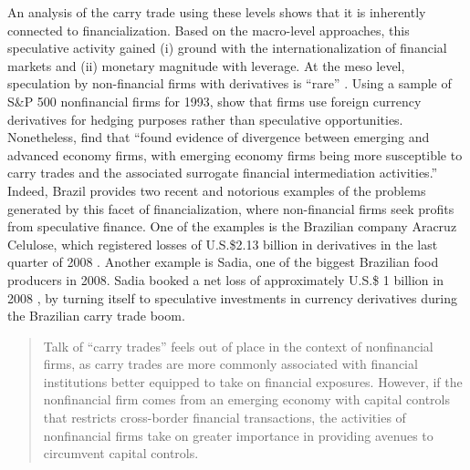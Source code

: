 \documentclass[a4paper, twoside]{templates/ociamthesis}
\begin{document}
An analysis of the carry trade using these levels shows that it is inherently connected to financialization. Based on the macro-level approaches, this speculative activity gained (i) ground with the internationalization of financial markets and (ii) monetary magnitude with leverage. At the meso level, speculation by non-financial firms with derivatives is ``rare'' \autocite{bartram2019}. Using a sample of S\&P 500 nonfinancial firms for 1993, \textcite{allayannis2001} show that firms use foreign currency derivatives for hedging purposes rather than speculative opportunities. Nonetheless, \textcite[ 741]{bruno2017} find that ``found evidence of divergence between emerging and advanced economy firms, with emerging economy firms being more susceptible to carry trades and the associated surrogate financial intermediation activities.'' Indeed, Brazil provides two recent and notorious examples of the problems generated by this facet of financialization, where non-financial firms seek profits from speculative finance. One of the examples is the Brazilian company Aracruz Celulose, which registered losses of U.S.\$2.13 billion in derivatives in the last quarter of 2008 \autocite{zeidan2013}. Another example is Sadia, one of the biggest Brazilian food producers in 2008. Sadia booked a net loss of approximately U.S.\$ 1 billion in 2008 \autocite{desouzamurcia2017}, by turning itself to speculative investments in currency derivatives during the Brazilian carry trade boom.

\begin{quote}
Talk of ``carry trades'' feels out of place in the context of nonfinancial firms, as carry trades are more commonly associated with financial institutions better equipped to take on financial exposures. However, if the nonfinancial firm comes from an emerging economy with capital controls that restricts cross-border financial transactions, the activities of nonfinancial firms take on greater importance in providing avenues to circumvent capital controls. \autocite[ 704-705]{bruno2017}
\end{quote}
\end{document}
